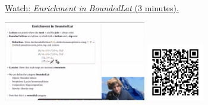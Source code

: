 
\begin{minipage}{10cm}
    \href{https://act4e-spring21.netlify.app/videos/spring2021-enrichment:bounded-lat-en.html}{Watch: \emph{Enrichment in BoundedLat} (3 minutes).}
        
    \href{https://act4e-spring21.netlify.app/videos/spring2021-enrichment:bounded-lat-en.html}{\includegraphics[height=3.5cm]{spring2021-enrichment:bounded-lat-en/thumbnails.jpg}}
    \href{https://act4e-spring21.netlify.app/videos/spring2021-enrichment:bounded-lat-en.html}{\includegraphics[height=2.5cm]{spring2021-enrichment:bounded-lat-en/qrcode.png}}
\end{minipage}
